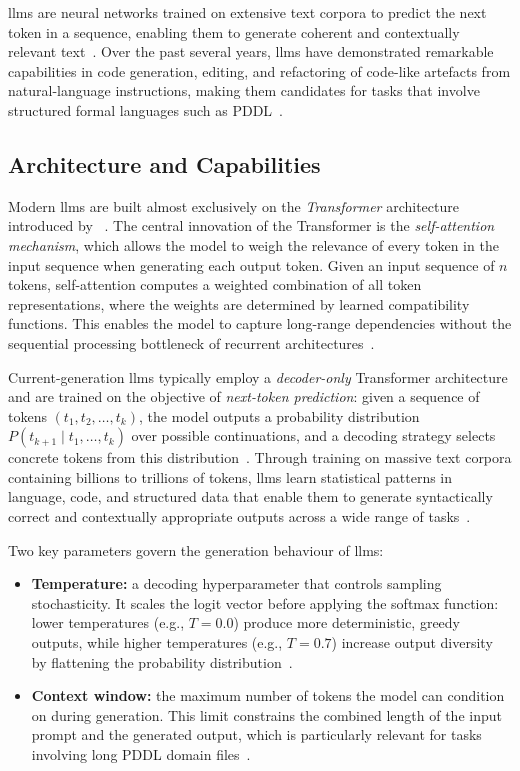 \Glspl{llm} are neural networks trained on extensive text corpora to predict the next token in a sequence, enabling them to generate coherent and contextually relevant text~\cite{Brown2020, Zhao2023}.
Over the past several years, \glspl{llm} have demonstrated remarkable capabilities in code generation, editing, and refactoring of code-like artefacts from natural-language instructions, making them candidates for tasks that involve structured formal languages such as PDDL~\cite{Minaee2024, Cassano2023}.

\subsection{Architecture and Capabilities}
\label{sec:bg:llm_arch}

Modern \glspl{llm} are built almost exclusively on the \emph{Transformer} architecture introduced by \citeauthor{Vaswani2017}~\cite{Vaswani2017}.
The central innovation of the Transformer is the \emph{self-attention mechanism}, which allows the model to weigh the relevance of every token in the input sequence when generating each output token.
Given an input sequence of $n$ tokens, self-attention computes a weighted combination of all token representations, where the weights are determined by learned compatibility functions.
This enables the model to capture long-range dependencies without the sequential processing bottleneck of recurrent architectures~\cite{Vaswani2017}.

Current-generation \glspl{llm} typically employ a \emph{decoder-only} Transformer architecture and are trained on the objective of \emph{next-token prediction}: given a sequence of tokens $(t_1, t_2, \ldots, t_{k})$, the model outputs a probability distribution $P(t_{k+1} \mid t_1, \ldots, t_k)$ over possible continuations, and a decoding strategy selects concrete tokens from this distribution~\cite{Zhao2023, Minaee2024}.
Through training on massive text corpora containing billions to trillions of tokens, \glspl{llm} learn statistical patterns in language, code, and structured data that enable them to generate syntactically correct and contextually appropriate outputs across a wide range of tasks~\cite{Brown2020}.

Two key parameters govern the generation behaviour of \glspl{llm}:

\begin{itemize}
  \item \textbf{Temperature:} a decoding hyperparameter that controls sampling stochasticity. It scales the logit vector before applying the softmax function: lower temperatures (e.g., $T{=}0.0$) produce more deterministic, greedy outputs, while higher temperatures (e.g., $T{=}0.7$) increase output diversity by flattening the probability distribution~\cite{Zhao2023}.

  \item \textbf{Context window:} the maximum number of tokens the model can condition on during generation. This limit constrains the combined length of the input prompt and the generated output, which is particularly relevant for tasks involving long PDDL domain files~\cite{Minaee2024}.
\end{itemize}

